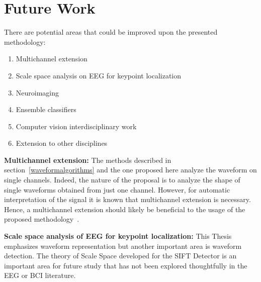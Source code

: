 
\section{Future Work}

There are potential areas that could be improved upon the presented methodology:

\begin{enumerate}
\item Multichannel extension
\item Scale space analysis on EEG for keypoint localization
\item Neuroimaging
\item Ensemble classifiers
\item Computer vision interdisciplinary work
\item Extension to other disciplines
\end{enumerate}

\textbf{Multichannel extension:}
The methods described in section~\ref{waveformalgorithms} and the one proposed here analyze the waveform on single channels.
Indeed, the nature of the proposal is to analyze the shape of single waveforms obtained from just one channel.  %
However, for automatic interpretation of the signal it is known that multichannel extension is necessary.  Hence, a multichannel extension should likely be beneficial to the usage of the proposed methodology~\cite{Gribonval2008}.

\textbf{Scale space analysis of EEG for keypoint localization:}
This Thesis emphasizes waveform representation but another important area is waveform detection.  The theory of Scale Space developed for the SIFT Detector is an important area for future study that has not been explored thoughtfully in the EEG or BCI literature.


